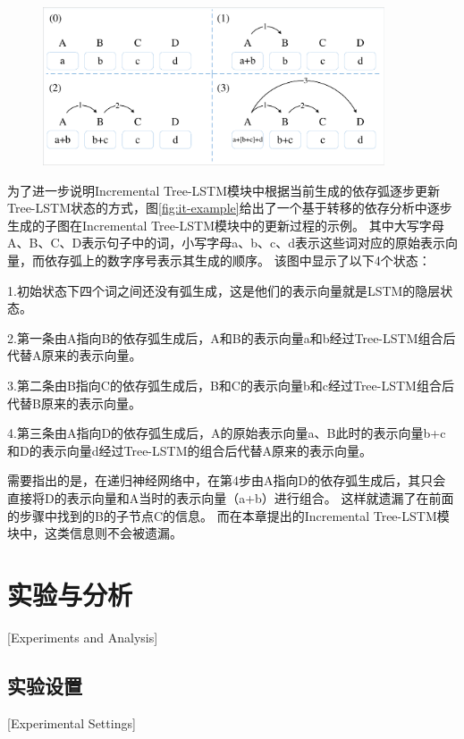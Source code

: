 \begin{figure}[hbtp]
	\centering
	\includegraphics[width=0.9\textwidth]{figures/it-example.pdf}
\end{figure}

为了进一步说明Incremental Tree-LSTM模块中根据当前生成的依存弧逐步更新Tree-LSTM状态的方式，图\ref{fig:it-example}给出了一个基于转移的依存分析中逐步生成的子图在Incremental Tree-LSTM模块中的更新过程的示例。
其中大写字母A、B、C、D表示句子中的词，小写字母a、b、c、d表示这些词对应的原始表示向量，而依存弧上的数字序号表示其生成的顺序。
该图中显示了以下4个状态：

1.初始状态下四个词之间还没有弧生成，这是他们的表示向量就是LSTM的隐层状态。

2.第一条由A指向B的依存弧生成后，A和B的表示向量a和b经过Tree-LSTM组合后代替A原来的表示向量。

3.第二条由B指向C的依存弧生成后，B和C的表示向量b和c经过Tree-LSTM组合后代替B原来的表示向量。

4.第三条由A指向D的依存弧生成后，A的原始表示向量a、B此时的表示向量b+c和D的表示向量d经过Tree-LSTM的组合后代替A原来的表示向量。

需要指出的是，在递归神经网络中，在第4步由A指向D的依存弧生成后，其只会直接将D的表示向量和A当时的表示向量（a+b）进行组合。
这样就遗漏了在前面的步骤中找到的B的子节点C的信息。
而在本章提出的Incremental Tree-LSTM模块中，这类信息则不会被遗漏。

\section{实验与分析}[Experiments and Analysis]

\subsection{实验设置}[Experimental Settings]
\label{sec:chapter2-experiment-setting}


